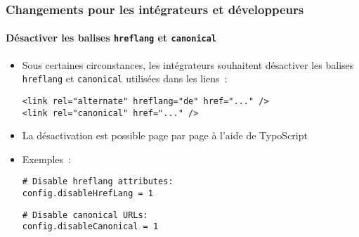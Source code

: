 %

\begin{frame}[fragile]
	\frametitle{Changements pour les intégrateurs et développeurs}
	\framesubtitle{Désactiver les balises \texttt{hreflang} et \texttt{canonical}}


	\begin{itemize}
		\item Sous certaines circonstances, les intégrateurs souhaitent désactiver les balises
			\texttt{hreflang} et \texttt{canonical} utilisées dans les liens~:
\begin{lstlisting}
<link rel="alternate" hreflang="de" href="..." />
<link rel="canonical" href="..." />
\end{lstlisting}
		\item La désactivation est possible page par page à l'aide de TypoScript
		\item Exemples~:
\begin{lstlisting}
# Disable hreflang attributes:
config.disableHrefLang = 1
\end{lstlisting}
\vspace{-0.2cm}
\begin{lstlisting}
# Disable canonical URLs:
config.disableCanonical = 1
\end{lstlisting}
	\end{itemize}

\end{frame}

